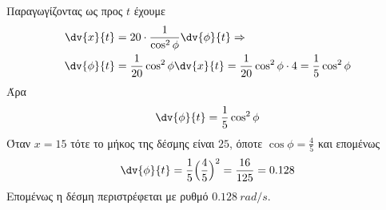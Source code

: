 \documentclass[a4paper,table]{report}
\begin{document}
\begin{solution}
    Παραγωγίζοντας ως προς $t$ έχουμε
    \begin{align*}
      \dv{x}{t} &= 20\cdot \frac{1}{\cos^{2}\phi}\dv{\phi}{t} \notag \Rightarrow \\
      \dv{\phi}{t}&=\frac{1}{20}\cos^{2}\phi \dv{x}{t} =\frac{1}{20}\cos^{2}\phi\cdot 4 =\frac{1}{5}\cos^{2}\phi
    \end{align*}
    Άρα
    \begin{equation} \label{eq:anglerate}
      \dv{\phi}{t}=\frac{1}{5}\cos^{2}\phi
    \end{equation}
    Όταν $x=15$ τότε το μήκος της δέσμης είναι $25$, όποτε $\cos\phi = \frac{4}{5}$ 
    και επομένως
    \[
      \dv{\phi}{t} = \frac{1}{5}\Bigl(\frac{4}{5}\Bigr)^{2} = \frac{16}{125} = 0.128
    \]
    Επομένως η δέσμη περιστρέφεται με ρυθμό $\SI{0.128}{rad/s}$.

  \end{solution}




  
\end{document}
